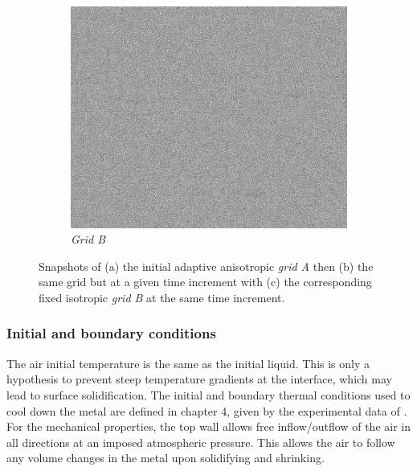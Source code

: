 \begin{figure}[htbp]
\begin{subfigure}[t]{0.3\textwidth}
    \label{fig:gridA}
  \end{subfigure}
  \begin{subfigure}[t]{0.3\textwidth}
    \centering
    \includegraphics[width=\textwidth]{Chapter5/Graphics/2d/GridB.png}
    \caption{\emph{Grid B}}
    \label{fig:gridB}
  \end{subfigure}
\caption{Snapshots of (a) the initial adaptive anisotropic \emph{grid A} then (b) the same grid but at 
a given time increment with (c) the corresponding fixed isotropic \emph{grid B} at the same time increment.}
\label{fig:smacs_grids}
\end{figure}


\subsubsection{Initial and boundary conditions}
The air initial temperature is the same as the initial liquid. This is only a hypothesis to prevent steep temperature gradients at the interface,
which may lead to surface solidification. The initial and boundary thermal conditions used to cool down the metal are defined in chapter 4, given by the experimental
data of \citet{hachani_experimental_2012}. For the mechanical properties, the top wall allows free inflow/outflow of the air in all directions 
at an imposed atmospheric pressure.
This allows the air to follow any volume changes in the metal upon solidifying and shrinking. 

